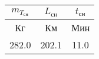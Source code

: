 \begin{tabular}{|c|c|c|}
\hline
$m_{T_{сн}}$ & $L_{сн}$ & $t_{сн}$ \\ 
\hline
Кг & Км & Мин \\ 
\hline
282.0 & 202.1 & 11.0 \\ 
\hline
\end{tabular}